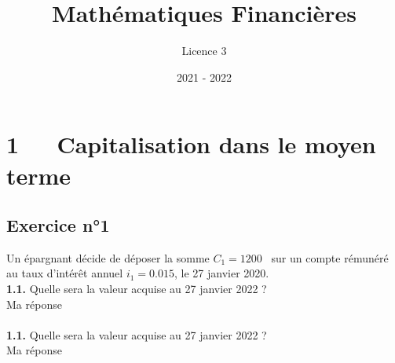 \documentclass{article}
\title{Mathématiques Financières}
\author{Licence 3}
\date{2021 - 2022}
\begin{document}
\normalsize
\maketitle

\renewcommand*\contentsname{Table des matières}
\newpage

\section{1   Capitalisation dans le moyen terme}
\subsection{Exercice n°1}
\textcolor{exogris}{
Un épargnant décide de déposer la somme $C_1 = 1200$ \texteuro sur un compte rémunéré au taux d’intérêt annuel $i_1 = 0.015$, le 27 janvier 2020.
}
\\ \textcolor{exogris}{\textbf{1.1.}
Quelle sera la valeur acquise au 27 janvier 2022 ?
}
\\%
Ma réponse
\\%
\\%
\textcolor{exogris}{\textbf{1.1.}
Quelle sera la valeur acquise au 27 janvier 2022 ?
}
\\%
Ma réponse
\end{document}
